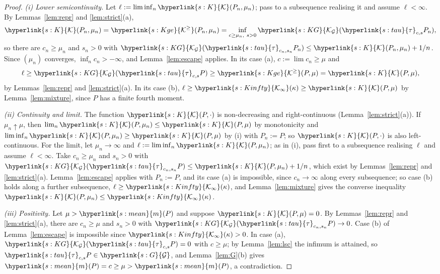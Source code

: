\documentclass[11pt]{article}
\newcommand{\sy}[2]{{\hyperlink{#1}{#2}}}
\newcommand{\mean}{\sy{s:mean}{m}}
\newcommand{\Kc}{\sy{s:K}{\mathcal{K}}}
\newcommand{\Kge}{\sy{s:Kge}{\mathcal{K}^{\ge}}}
\newcommand{\Gk}{\sy{s:G}{\mathcal{G}}}
\newcommand{\KG}{\sy{s:KG}{\mathcal{K}_{\mathcal{G}}}}
\newcommand{\tauc}{\sy{s:tau}{\tau}}
\newcommand{\Kinfty}{\sy{s:Kinfty}{\mathcal{K}_{\infty}}}
\begin{document}
\begin{proof}
\emph{(i) Lower semicontinuity.} Let $\ell:=\liminf_n\Kc(P_n,\mu_n)$; pass to a subsequence realising it and assume
$\ell<\infty$. By Lemmas~\ref{lem:repr} and \ref{lem:strict}(a),
\begin{equation*}
  \Kc(P_n,\mu_n)=\Kge(P_n,\mu_n)=\inf_{c\ge\mu_n,\ s>0}\KG(\tauc_{c,s}P_n),
\end{equation*}
so there are $c_n\ge\mu_n$ and $s_n>0$ with $\KG(\tauc_{c_n,s_n}P_n)\le\Kc(P_n,\mu_n)+1/n$. Since $(\mu_n)$ converges,
$\inf_nc_n>-\infty$, and Lemma~\ref{lem:escape} applies. In its case (a), $c:=\lim c_n\ge\mu$ and
\begin{equation*}
  \ell\ge\KG(\tauc_{c,s}P)\ge\Kge(P,\mu)=\Kc(P,\mu),
\end{equation*}
by Lemmas~\ref{lem:repr} and \ref{lem:strict}(a). In its case (b), $\ell\ge\Kinfty(\kappa)\ge\Kc(P,\mu)$ by
Lemma~\ref{lem:mixture}, since $P$ has a finite fourth moment.

\emph{(ii) Continuity and limit.} The function $\Kc(P,\cdot)$ is non-decreasing and right-continuous
(Lemma~\ref{lem:strict}(a)). If $\mu_n\uparrow\mu$, then $\lim_n\Kc(P,\mu_n)\le\Kc(P,\mu)$ by monotonicity and
$\liminf_n\Kc(P,\mu_n)\ge\Kc(P,\mu)$ by (i) with $P_n:=P$; so $\Kc(P,\cdot)$ is also left-continuous. For the limit, let
$\mu_n\to\infty$ and $\ell:=\liminf_n\Kc(P,\mu_n)$; as in (i), pass first to a subsequence realising $\ell$ and assume
$\ell<\infty$. Take $c_n\ge\mu_n$ and $s_n>0$ with $\KG(\tauc_{c_n,s_n}P)\le\Kc(P,\mu_n)+1/n$, which exist by
Lemmas~\ref{lem:repr} and \ref{lem:strict}(a). Lemma~\ref{lem:escape} applies with $P_n:=P$, and its case (a) is impossible,
since $c_n\to\infty$ along every subsequence; so case (b) holds along a further subsequence, $\ell\ge\Kinfty(\kappa)$, and
Lemma~\ref{lem:mixture} gives the converse inequality $\Kc(P,\mu_n)\le\Kinfty(\kappa)$.

\emph{(iii) Positivity.} Let $\mu>\mean(P)$ and suppose $\Kc(P,\mu)=0$. By Lemmas~\ref{lem:repr} and \ref{lem:strict}(a), there
are $c_n\ge\mu$ and $s_n>0$ with $\KG(\tauc_{c_n,s_n}P)\to0$. Case (b) of Lemma~\ref{lem:escape} is impossible since
$\Kinfty(\kappa)>0$. In case (a), $\KG(\tauc_{c,s}P)=0$ with $c\ge\mu$; by Lemma~\ref{lem:lsc} the infimum is attained, so
$\tauc_{c,s}P\in\Gk$, and Lemma~\ref{lem:G}(b) gives $\mean(P)=c\ge\mu>\mean(P)$, a contradiction.
\end{proof}
\end{document}
